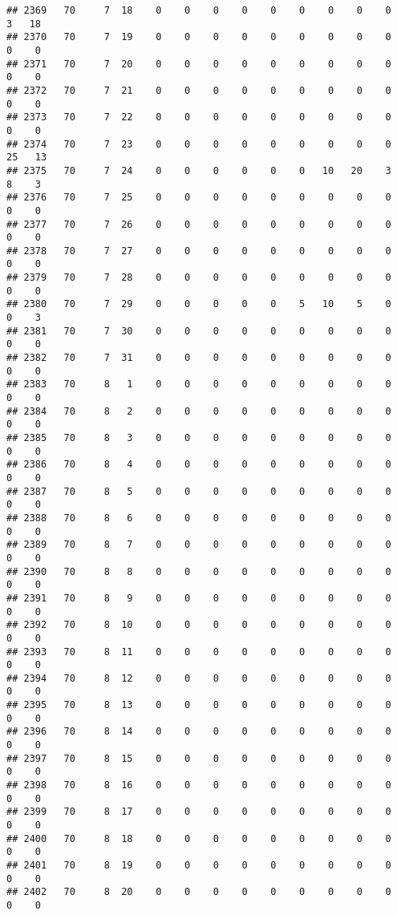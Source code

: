 \documentclass[]{article}
\begin{document}
\begin{verbatim}
## 2369   70     7  18    0    0    0    0    0    0    0    0    0    3   18
## 2370   70     7  19    0    0    0    0    0    0    0    0    0    0    0
## 2371   70     7  20    0    0    0    0    0    0    0    0    0    0    0
## 2372   70     7  21    0    0    0    0    0    0    0    0    0    0    0
## 2373   70     7  22    0    0    0    0    0    0    0    0    0    0    0
## 2374   70     7  23    0    0    0    0    0    0    0    0    0   25   13
## 2375   70     7  24    0    0    0    0    0    0   10   20    3    8    3
## 2376   70     7  25    0    0    0    0    0    0    0    0    0    0    0
## 2377   70     7  26    0    0    0    0    0    0    0    0    0    0    0
## 2378   70     7  27    0    0    0    0    0    0    0    0    0    0    0
## 2379   70     7  28    0    0    0    0    0    0    0    0    0    0    0
## 2380   70     7  29    0    0    0    0    0    5   10    5    0    0    3
## 2381   70     7  30    0    0    0    0    0    0    0    0    0    0    0
## 2382   70     7  31    0    0    0    0    0    0    0    0    0    0    0
## 2383   70     8   1    0    0    0    0    0    0    0    0    0    0    0
## 2384   70     8   2    0    0    0    0    0    0    0    0    0    0    0
## 2385   70     8   3    0    0    0    0    0    0    0    0    0    0    0
## 2386   70     8   4    0    0    0    0    0    0    0    0    0    0    0
## 2387   70     8   5    0    0    0    0    0    0    0    0    0    0    0
## 2388   70     8   6    0    0    0    0    0    0    0    0    0    0    0
## 2389   70     8   7    0    0    0    0    0    0    0    0    0    0    0
## 2390   70     8   8    0    0    0    0    0    0    0    0    0    0    0
## 2391   70     8   9    0    0    0    0    0    0    0    0    0    0    0
## 2392   70     8  10    0    0    0    0    0    0    0    0    0    0    0
## 2393   70     8  11    0    0    0    0    0    0    0    0    0    0    0
## 2394   70     8  12    0    0    0    0    0    0    0    0    0    0    0
## 2395   70     8  13    0    0    0    0    0    0    0    0    0    0    0
## 2396   70     8  14    0    0    0    0    0    0    0    0    0    0    0
## 2397   70     8  15    0    0    0    0    0    0    0    0    0    0    0
## 2398   70     8  16    0    0    0    0    0    0    0    0    0    0    0
## 2399   70     8  17    0    0    0    0    0    0    0    0    0    0    0
## 2400   70     8  18    0    0    0    0    0    0    0    0    0    0    0
## 2401   70     8  19    0    0    0    0    0    0    0    0    0    0    0
## 2402   70     8  20    0    0    0    0    0    0    0    0    0    0    0

\end{verbatim}
\end{document}
